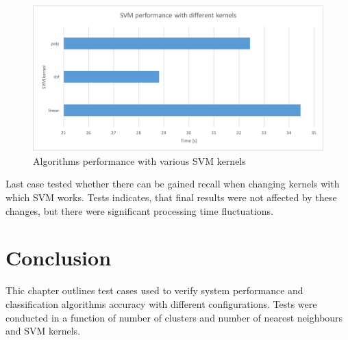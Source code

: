 \begin{figure}[H]
	\begin{center}
		\includegraphics[width=0.9\linewidth]{images/tests/param-svm.png}
		\caption{Algorithms performance with various SVM kernels}
		\label{param-svm}
	\end{center}
\end{figure}

Last case tested whether there can be gained recall when changing kernels with which SVM works. Tests indicates, that final results were not affected by these changes, but there were significant processing time fluctuations.

\section{Conclusion}
Thic chapter outlines test cases used to verify system performance and classification algorithms accuracy with different configurations. Tests were conducted in a function of number of clusters and number of nearest neighbours and SVM kernels.
